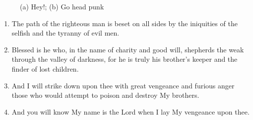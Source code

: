 \documentclass[a4paper, 11pt]{article}
\begin{document}
\begin{figure}[ht!]
\begin{minipage}[c]{.49\linewidth}
  \end{minipage}
  \caption{(a) Hey!; (b) Go head punk}
  \label{fig::example::two}
\end{figure}

\begin{enumerate}
 \item The path of the righteous man is beset on all sides by the iniquities of the selfish and the tyranny of evil men. 
 \item Blessed is he who, in the name of charity and good will, shepherds the weak through the valley of darkness, for he is truly his brother's keeper and the finder of lost children. 
 \item And I will strike down upon thee with great vengeance and furious anger those who would attempt to poison and destroy My brothers. 
 \item And you will know My name is the Lord when I lay My vengeance upon thee.
\end{enumerate}


\end{document}
